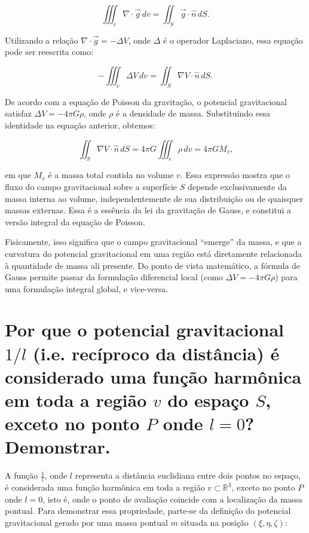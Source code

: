 \[
\iiint_v \nabla \cdot \vec{g} \, dv = \iint_S \vec{g} \cdot \hat{n} \, dS \text{.}
\]

\noindent
Utilizando a relação \( \nabla \cdot \vec{g} = -\Delta V \), onde \( \Delta \) é o operador Laplaciano, essa equação pode ser reescrita como:

\[
-\iiint_v \Delta V \, dv = \iint_S \nabla V \cdot \hat{n} \, dS \text{.}
\]

\noindent
De acordo com a equação de Poisson da gravitação, o potencial gravitacional satisfaz \( \Delta V = -4\pi G \rho \), onde \( \rho \) é a densidade de massa. Substituindo essa identidade na equação anterior, obtemos:

\[
\iint_S \nabla V \cdot \hat{n} \, dS = 4\pi G \iiint_v \rho \, dv = 4\pi G M_v \text{,}
\]

\noindent
em que \( M_v \) é a massa total contida no volume \( v \). Essa expressão mostra que o fluxo do campo gravitacional sobre a superfície \( S \) depende exclusivamente da massa interna ao volume, independentemente de sua distribuição ou de quaisquer massas externas. Essa é a essência da lei da gravitação de Gauss, e constitui a versão integral da equação de Poisson.

Fisicamente, isso significa que o campo gravitacional “emerge” da massa, e que a curvatura do potencial gravitacional em uma região está diretamente relacionada à quantidade de massa ali presente. Do ponto de vista matemático, a fórmula de Gauss permite passar da formulação diferencial local (como \( \Delta V = -4\pi G \rho \)) para uma formulação integral global, e vice-versa. 



\section{Por que o potencial gravitacional $1/l$ (i.e. recíproco da distância) é considerado uma função harmônica em toda a região $v$ do espaço $S$, exceto no ponto $P$ onde $l=0$? Demonstrar.}


A função \( \frac{1}{l} \), onde \( l \) representa a distância euclidiana entre dois pontos no espaço, é considerada uma função harmônica em toda a região \( v \subset \mathbb{R}^3 \), exceto no ponto \( P \) onde \( l = 0 \), isto é, onde o ponto de avaliação coincide com a localização da massa pontual. Para demonstrar essa propriedade, parte-se da definição do potencial gravitacional gerado por uma massa pontual \( m \) situada na posição \( (\xi, \eta, \zeta) \):

